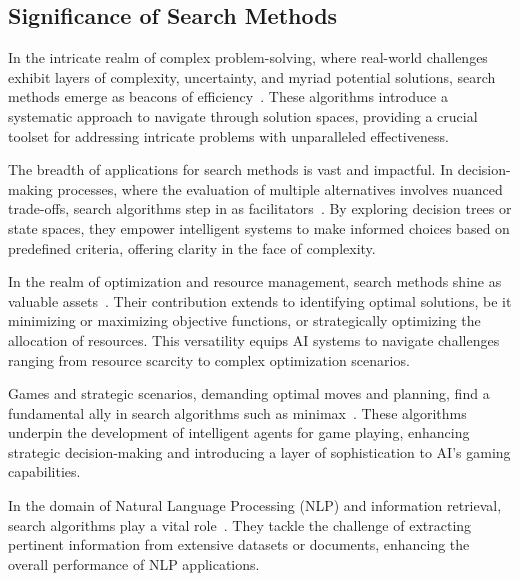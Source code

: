 \documentclass[12pt]{article}
\begin{document}

\subsection{Significance of Search Methods}

In the intricate realm of complex problem-solving, where real-world challenges exhibit layers of complexity, uncertainty, 
and myriad potential solutions, search methods emerge as beacons of efficiency~\cite{russell2009ai}. These algorithms introduce a systematic 
approach to navigate through solution spaces, providing a crucial toolset for addressing intricate problems with unparalleled 
effectiveness.

The breadth of applications for search methods is vast and impactful. In decision-making processes, where the evaluation of 
multiple alternatives involves nuanced trade-offs, search algorithms step in as facilitators~\cite{nilsson2014principles}. By exploring decision trees or 
state spaces, they empower intelligent systems to make informed choices based on predefined criteria, offering clarity in the 
face of complexity.

In the realm of optimization and resource management, search methods shine as valuable assets~\cite{cormen2009introduction}. Their contribution extends to 
identifying optimal solutions, be it minimizing or maximizing objective functions, or strategically optimizing the allocation 
of resources. This versatility equips AI systems to navigate challenges ranging from resource scarcity to complex optimization 
scenarios.

Games and strategic scenarios, demanding optimal moves and planning, find a fundamental ally in search algorithms such as 
minimax~\cite{russell2009ai}. These algorithms underpin the development of intelligent agents for game playing, enhancing strategic decision-making 
and introducing a layer of sophistication to AI's gaming capabilities.

In the domain of Natural Language Processing (NLP) and information retrieval, search algorithms play a vital role~\cite{cormen2009introduction}. They tackle 
the challenge of extracting pertinent information from extensive datasets or documents, enhancing the overall performance of NLP 
applications.
\end{document}
